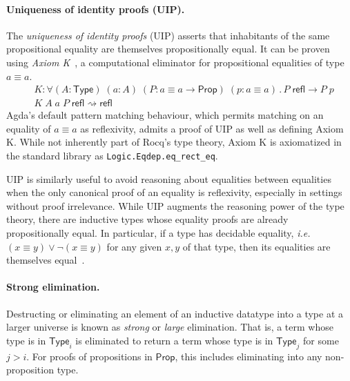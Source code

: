 \documentclass{article}
\makeatletter
\newcommand{\ie}{\textit{i.e.}\@\xspace}
\newcommand{\kw}[1]{\mathsf{#1}}
\newcommand{\code}[1]{\texttt{#1}}
\makeatother
\begin{document}
\paragraph{Uniqueness of identity proofs (UIP).}
The \emph{uniqueness of identity proofs} (UIP)
asserts that inhabitants of the same propositional equality
are themselves propositionally equal.
It can be proven using \emph{Axiom K}~\citep{axiomk},
a computational eliminator for propositional equalities of type $a \equiv a$.
%
\begin{align*}
  &K : \forall (A : \kw{Type}) \; (a : A) \; (P : a \equiv a \to \kw{Prop}) \; (p : a \equiv a) \mathpunct{.}
    P \; \kw{refl} \to P \; p \\
  &K \; A \; a \; P \; \kw{refl} \rightsquigarrow \kw{refl}
\end{align*}
%
Agda's default pattern matching behaviour,
which permits matching on an equality of $a \equiv a$ as reflexivity,
admits a proof of UIP as well as defining Axiom K.
While not inherently part of Rocq's type theory,
Axiom K is axiomatized in the standard library as \code{Logic.Eqdep.eq\_rect\_eq}.

UIP is similarly useful to avoid reasoning about equalities between equalities
when the only canonical proof of an equality is reflexivity,
especially in settings without proof irrelevance.
While UIP augments the reasoning power of the type theory,
there are inductive types whose equality proofs are already propositionally equal.
In particular, if a type has decidable equality,
\ie $(x \equiv y) \vee \neg (x \equiv y)$ for any given $x, y$ of that type,
then its equalities are themselves equal~\citep{hedberg}.

\paragraph{Strong elimination.}
Destructing or eliminating an element of an inductive datatype
into a type at a larger universe is known as \emph{strong} or \emph{large} elimination.
That is, a term whose type is in $\kw{Type}_i$
is eliminated to return a term whose type is in $\kw{Type}_j$
for some $j > i$.
For proofs of propositions in $\kw{Prop}$,
this includes eliminating into any non-proposition type.
\end{document}
